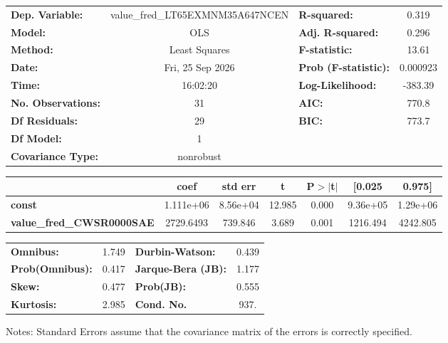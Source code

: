 \begin{center}
\begin{tabular}{lclc}
\toprule
\textbf{Dep. Variable:}           & value\_fred\_LT65EXMNM35A647NCEN & \textbf{  R-squared:         } &     0.319   \\
\textbf{Model:}                   &               OLS                & \textbf{  Adj. R-squared:    } &     0.296   \\
\textbf{Method:}                  &          Least Squares           & \textbf{  F-statistic:       } &     13.61   \\
\textbf{Date:}                    &         Fri, 25 Sep 2026         & \textbf{  Prob (F-statistic):} &  0.000923   \\
\textbf{Time:}                    &             16:02:20             & \textbf{  Log-Likelihood:    } &   -383.39   \\
\textbf{No. Observations:}        &                  31              & \textbf{  AIC:               } &     770.8   \\
\textbf{Df Residuals:}            &                  29              & \textbf{  BIC:               } &     773.7   \\
\textbf{Df Model:}                &                   1              & \textbf{                     } &             \\
\textbf{Covariance Type:}         &            nonrobust             & \textbf{                     } &             \\
\bottomrule
\end{tabular}
\begin{tabular}{lcccccc}
                                  & \textbf{coef} & \textbf{std err} & \textbf{t} & \textbf{P$> |$t$|$} & \textbf{[0.025} & \textbf{0.975]}  \\
\midrule
\textbf{const}                    &    1.111e+06  &     8.56e+04     &    12.985  &         0.000        &     9.36e+05    &     1.29e+06     \\
\textbf{value\_fred\_CWSR0000SAE} &    2729.6493  &      739.846     &     3.689  &         0.001        &     1216.494    &     4242.805     \\
\bottomrule
\end{tabular}
\begin{tabular}{lclc}
\textbf{Omnibus:}       &  1.749 & \textbf{  Durbin-Watson:     } &    0.439  \\
\textbf{Prob(Omnibus):} &  0.417 & \textbf{  Jarque-Bera (JB):  } &    1.177  \\
\textbf{Skew:}          &  0.477 & \textbf{  Prob(JB):          } &    0.555  \\
\textbf{Kurtosis:}      &  2.985 & \textbf{  Cond. No.          } &     937.  \\
\bottomrule
\end{tabular}
\end{center}

Notes: \newline
 [1] Standard Errors assume that the covariance matrix of the errors is correctly specified.